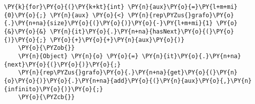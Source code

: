 \begin{Verbatim}[commandchars=\\\{\}]
\PY{k}{for}\PY{o}{(}\PY{k+kt}{int} \PY{n}{aux}\PY{o}{=}\PY{l+m+mi}{0}\PY{o}{;} \PY{n}{aux} \PY{o}{<} \PY{n}{rep\PYZus{}grafo}\PY{o}{.}\PY{n+na}{size}\PY{o}{(}\PY{o}{)}\PY{o}{-}\PY{l+m+mi}{1} \PY{o}{&}\PY{o}{&} \PY{n}{it}\PY{o}{.}\PY{n+na}{hasNext}\PY{o}{(}\PY{o}{)}\PY{o}{;} \PY{o}{+}\PY{o}{+}\PY{n}{aux}\PY{o}{)}
    \PY{o}{\PYZob{}}
	\PY{n}{Object} \PY{n}{o} \PY{o}{=} \PY{n}{it}\PY{o}{.}\PY{n+na}{next}\PY{o}{(}\PY{o}{)}\PY{o}{;}
	\PY{n}{rep\PYZus{}grafo}\PY{o}{.}\PY{n+na}{get}\PY{o}{(}\PY{n}{o}\PY{o}{)}\PY{o}{.}\PY{n+na}{add}\PY{o}{(}\PY{n}{aux}\PY{o}{,}\PY{n}{infinito}\PY{o}{)}\PY{o}{;}
    \PY{o}{\PYZcb{}}
\end{Verbatim}
